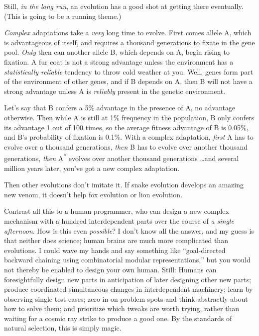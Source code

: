 {
 Still, \textit{in the long run}, an evolution has a good shot at
getting there eventually. (This is going to be a running theme.)}

{
 \textit{Complex} adaptations take a \textit{very} long time to
evolve. First comes allele A, which is advantageous of itself, and
requires a thousand generations to fixate in the gene pool.
\textit{Only} then can another allele B, which depends on A, begin
rising to fixation. A fur coat is not a strong advantage unless the
environment has a \textit{statistically reliable} tendency to throw
cold weather at you. Well, genes form part of the environment of other
genes, and if B depends on A, then B will not have a strong advantage
unless A is \textit{reliably} present in the genetic environment.}

{
 Let's say that B confers a 5\% advantage in the
presence of A, no advantage otherwise. Then while A is still at 1\%
frequency in the population, B only confers its advantage 1 out of 100
times, so the average fitness advantage of B is 0.05\%, and
B's probability of fixation is 0.1\%. With a complex
adaptation, \textit{first} A has to evolve over a thousand generations,
\textit{then} B has to evolve over another thousand generations,
\textit{then} A\textsuperscript{*} evolves over another thousand
generations \ldots and several million years later,
you've got a new complex adaptation.}

{
 Then other evolutions don't imitate it. If snake
evolution develops an amazing new venom, it doesn't
help fox evolution or lion evolution.}

{
 Contrast all this to a human programmer, who can design a new
complex mechanism with a hundred interdependent parts over the course
of \textit{a single afternoon}. How is this even \textit{possible}? I
don't know all the answer, and my guess is that neither
does science; human brains are much more complicated than evolutions. I
could wave my hands and say something like
``goal-directed backward chaining using combinatorial
modular representations,'' but you would not thereby
be enabled to design your own human. Still: Humans can foresightfully
design new parts in anticipation of later designing other new parts;
produce coordinated simultaneous changes in interdependent machinery;
learn by observing single test cases; zero in on problem spots and
think abstractly about how to solve them; and prioritize which tweaks
are worth trying, rather than waiting for a cosmic ray strike to
produce a good one. By the standards of natural selection, this is
simply magic.}

